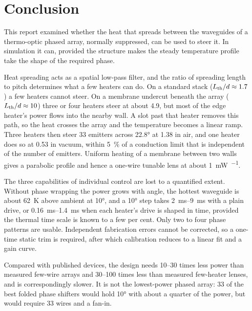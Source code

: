 \section{Conclusion}
\label{sec:conclusion}

This report examined whether the heat that spreads between the waveguides of a thermo-optic phased array, normally
suppressed, can be used to steer it. In simulation it can, provided the structure makes the steady temperature
profile take the shape of the required phase.

Heat spreading acts as a spatial low-pass filter, and the ratio of spreading length to pitch determines what a few
heaters can do. On a standard stack ($L_{\mathrm{th}}/d\approx1.7$) a few heaters cannot steer. On a membrane undercut beneath
the array ($L_{\mathrm{th}}/d\approx10$) three or four heaters steer at about \qty{4.9}{\mWdeg}, but most of the edge heater's
power flows into the nearby wall. A slot past that heater removes this path, so the heat crosses the array and the
temperature becomes a linear ramp. Three heaters then steer \num{33} emitters across \ang{22.8} at \qty{1.38}{\mWdeg}
in air, and one heater does so at \qty{0.53}{\mWdeg} in vacuum, within \qty{5}{\percent} of a conduction limit that is
independent of the number of emitters. Uniform heating of a membrane between two walls gives a parabolic profile and
hence a one-wire tunable lens at about \qty{1}{\milli\watt\per\rad}.

The three capabilities of individual control are lost to a quantified extent. Without phase wrapping the power grows
with angle, the hottest waveguide is about \qty{62}{\kelvin} above ambient at \ang{10}, and a \ang{10} step takes
\qtyrange{2}{9}{\milli\second} with a plain drive, or \qtyrange{0.16}{1.4}{\milli\second} when each heater's
drive is shaped in time, provided the thermal time scale is known to a few per cent. Only two to four phase patterns are usable. Independent fabrication errors cannot be
corrected, so a one-time static trim is required, after which calibration reduces to a linear fit and a gain curve.

Compared with published devices, the design needs \numrange{10}{30} times less power than measured few-wire arrays and
\numrange{30}{100} times less than measured few-heater lenses, and is correspondingly slower. It is not the
lowest-power phased array: \num{33} of the best folded phase shifters would hold \ang{10} with about a quarter of the
power, but would require \num{33} wires and a fan-in.

